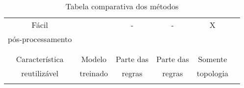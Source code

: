 \begin{table}
\begin{center}
\begin{tabular}{|c|c|c|c|c|c|}
       Fácil             &          &    -      &      -       &      X     \\
       pós-processamento &          &           &              &            \\
                         &          &           &              &            \\
       \hline
                         &          &           &              &            \\
       Característica    & Modelo   & Parte das & Parte das    & Somente    \\
       reutilizável      & treinado & regras    & regras       & topologia  \\
                         &          &           &              &            \\
       \hline
     \end{tabular}
   \caption{Tabela comparativa dos métodos}
   \label{table:metodos}
   \end{center}
 \end{table}

